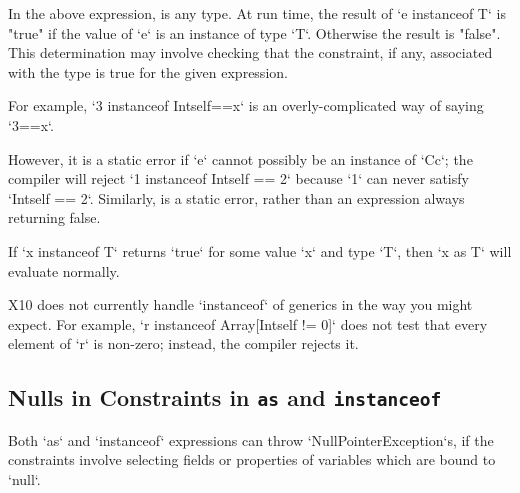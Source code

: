 In the above expression,  is any type. At run time, the
result of \xcd`e instanceof T`
is \xcd"true" if the
value of \xcd`e` is an instance of type \xcd`T`.
Otherwise the result is \xcd"false". This determination may involve checking
that the constraint, if any, associated with the type is true for the given
expression.

For example, \xcd`3 instanceof Int{self==x}` is an overly-complicated way of
saying \xcd`3==x`.



However, it is a static error if \xcd`e` cannot possibly be an instance of
\xcd`C{c}`; the compiler will reject \xcd`1 instanceof Int{self == 2}` because
\xcd`1` can never satisfy \xcd`Int{self == 2}`. Similarly,  is a static error, rather than an expression always returning false. 

If \xcd`x instanceof T` returns \xcd`true` for some value \xcd`x` and type
\xcd`T`, then \xcd`x as T` will evaluate normally.  


\limitationx
X10 does not currently handle \xcd`instanceof` of generics in the way you
might expect.  For example, \xcd`r instanceof Array[Int{self != 0}]` does
not test that every element of \xcd`r` is non-zero; instead, the compiler
rejects it.


\subsection{Nulls in Constraints in {\tt as} and {\tt instanceof}}

Both \xcd`as` and \xcd`instanceof` expressions can throw
\xcd`NullPointerException`s, if the constraints involve selecting fields
or properties of variables which are bound to \xcd`null`.  

